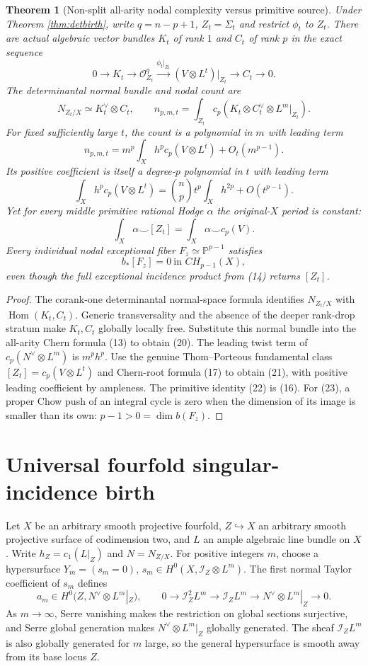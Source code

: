 \documentclass[11pt]{article}
\newtheorem{theorem}{Theorem}
\begin{document}
\begin{theorem}[Non-split all-arity nodal complexity versus primitive source]
Under Theorem \ref{thm:detbirth}, write
$q=n-p+1$, $Z_t=\Sigma_t$ and restrict $\phi_t$ to $Z_t$.
There are actual algebraic vector bundles $K_t$ of rank $1$
and $C_t$ of rank $p$ in the exact sequence
\[
0\to K_t\to\mathcal O_{Z_t}^{q}
 \xrightarrow{\phi_t|_{Z_t}}(V\otimes L^t)|_{Z_t}
 \to C_t\to0.
\]
The determinantal normal bundle and nodal count are
\[
\boxed{N_{Z_t/X}\simeq K_t^\vee\otimes C_t,\qquad
n_{p,m,t}=\int_{Z_t}
 c_p(K_t\otimes C_t^\vee\otimes L^m|_{Z_t}).} \tag{20}
\]
For fixed sufficiently large $t$, the count is a polynomial
in $m$ with leading term
\[
n_{p,m,t}=m^p\int_Xh^p c_p(V\otimes L^t)+O_t(m^{p-1}).
\]
Its positive coefficient is itself a degree-$p$ polynomial
in $t$ with leading term
\[
\boxed{\int_Xh^p c_p(V\otimes L^t)
 ={n\choose p}t^p\int_X h^{2p}+O(t^{p-1}).} \tag{21}
\]
Yet for every middle primitive rational Hodge $\alpha$
the original-$X$ period is constant:
\[
\boxed{\int_X\alpha\smile [Z_t]
       =\int_X\alpha\smile c_p(V).} \tag{22}
\]
Every individual nodal exceptional fiber
$F_z\simeq\mathbb P^{p-1}$ satisfies
\[
\boxed{b_*[F_z]=0\ \text{in }CH_{p-1}(X),} \tag{23}
\]
even though the \emph{full exceptional incidence product}
from (14) returns $[Z_t]$.
\end{theorem}
\begin{proof}
The corank-one determinantal normal-space formula
identifies $N_{Z_t/X}$ with $\operatorname{Hom}(K_t,C_t)$.
Generic transversality and the absence of the deeper
rank-drop stratum make $K_t,C_t$ globally locally free.
Substitute this normal bundle into the all-arity Chern
formula (13) to obtain (20). The leading twist term
of $c_p(N^\vee\otimes L^m)$ is $m^p h^p$.
Use the genuine Thom--Porteous fundamental class
$[Z_t]=c_p(V\otimes L^t)$ and Chern-root formula
(17) to obtain (21), with positive leading coefficient
by ampleness. The primitive identity (22) is (16).
For (23), a proper Chow push of an integral cycle is zero
when the dimension of its image is smaller than its own:
$p-1>0=\dim b(F_z)$.
\end{proof}

\section{Universal fourfold singular-incidence birth}
Let $X$ be an arbitrary smooth projective fourfold,
$Z\hookrightarrow X$ an arbitrary smooth projective surface
of codimension two, and $L$ an ample algebraic line bundle on $X$.
Write $h_Z=c_1(L|_Z)$ and $N=N_{Z/X}$.
For positive integers $m$, choose a hypersurface
$Y_m=(s_m=0)$, $s_m\in H^0(X,\mathcal I_Z\otimes L^m)$.
The first normal Taylor coefficient of $s_m$ defines
\[
 a_m\in H^0\bigl(Z,N^\vee\otimes L^m|_Z\bigr),\qquad
 0\longrightarrow \mathcal I_Z^2 L^m
 \longrightarrow \mathcal I_Z L^m
 \longrightarrow N^\vee\otimes L^m|_Z\longrightarrow0.
 \tag{1}
\]
As $m\to\infty$, Serre vanishing makes the restriction on
global sections surjective, and Serre global generation
makes $N^\vee\otimes L^m|_Z$ globally generated. The sheaf
$\mathcal I_Z L^m$ is also globally generated for $m$ large,
so the general hypersurface is smooth away from its
base locus $Z$.
\end{document}
